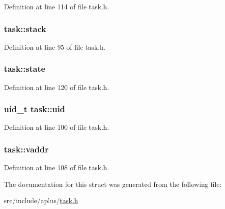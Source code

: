 Definition at line 114 of file task.\+h.

\hypertarget{structtask_a71232ebd31259f41c057b3e789b44587}{
\subsubsection[{stack}]{ task\+::stack}}\label{structtask_a71232ebd31259f41c057b3e789b44587}


Definition at line 95 of file task.\+h.

\hypertarget{structtask_a09ebd490ccb87f169fd7c3d8d95b4f39}{
\subsubsection[{state}]{ task\+::state}}\label{structtask_a09ebd490ccb87f169fd7c3d8d95b4f39}


Definition at line 120 of file task.\+h.

\hypertarget{structtask_ade8fc4c414bce856dacf9efee3031be8}{
\subsubsection[{uid}]{\setlength{\rightskip}{0pt plus 5cm}uid\+\_\+t task\+::uid}}\label{structtask_ade8fc4c414bce856dacf9efee3031be8}


Definition at line 100 of file task.\+h.

\hypertarget{structtask_a340cbedbdc4b542793e7677dd4966ade}{
\subsubsection[{vaddr}]{ task\+::vaddr}}\label{structtask_a340cbedbdc4b542793e7677dd4966ade}


Definition at line 108 of file task.\+h.



The documentation for this struct was generated from the following file\+:\begin{DoxyCompactItemize}
\item 
src/include/aplus/\hyperlink{task_8h}{task.\+h}\end{DoxyCompactItemize}
